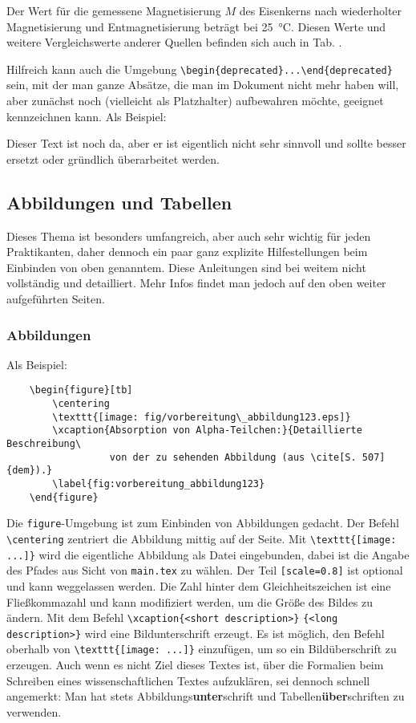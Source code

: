 Der Wert für die gemessene Magnetisierung $M$ des Eisenkerns nach wiederholter Magnetisierung und Entmagnetisierung beträgt  bei \SI{25}{\celsius}. Diesen Werte und weitere Vergleichswerte anderer Quellen befinden sich auch in Tab. .

Hilfreich kann auch die Umgebung \verb|\begin{deprecated}...\end{deprecated}| sein, mit der man ganze Absätze, die man im Dokument nicht mehr haben will, aber zunächst noch (vielleicht als Platzhalter) aufbewahren möchte, geeignet kennzeichnen kann. Als Beispiel:

\begin{deprecated}
Dieser Text ist noch da, aber er ist eigentlich nicht sehr sinnvoll und sollte besser ersetzt oder gründlich überarbeitet werden.
\end{deprecated}

\subsection{Abbildungen und Tabellen}
Dieses Thema ist besonders umfangreich, aber auch sehr wichtig für jeden Praktikanten, daher dennoch ein paar ganz explizite Hilfestellungen beim Einbinden von oben genanntem. Diese Anleitungen sind bei weitem nicht vollständig und detailliert. Mehr Infos findet man jedoch auf den oben weiter aufgeführten Seiten.

\subsubsection{Abbildungen}
Als Beispiel:
\begin{verbatim}
	\begin{figure}[tb]
	    \centering
	    \texttt{[image: fig/vorbereitung\_abbildung123.eps]}
	    \xcaption{Absorption von Alpha-Teilchen:}{Detaillierte Beschreibung\
	              von der zu sehenden Abbildung (aus \cite[S. 507]{dem}).}
	    \label{fig:vorbereitung_abbildung123}
	\end{figure}
\end{verbatim}
Die \verb|figure|-Umgebung ist zum Einbinden von Abbildungen gedacht. Der Befehl \verb|\centering| zentriert die Abbildung mittig auf der Seite. Mit \verb|\texttt{[image: ...]}| wird die eigentliche Abbildung als Datei eingebunden, dabei ist die Angabe des Pfades aus Sicht von \verb|main.tex| zu wählen. Der Teil \verb|[scale=0.8]| ist optional und kann weggelassen werden. Die Zahl hinter dem Gleichheitszeichen ist eine Fließkommazahl und kann modifiziert werden, um die Größe des Bildes zu ändern. Mit dem Befehl \verb|\xcaption{<short description>}| \verb|{<long description>}| wird eine Bildunterschrift erzeugt. Es ist möglich, den Befehl oberhalb von \verb|\texttt{[image: ...]}| einzufügen, um so ein Bildüberschrift zu erzeugen. Auch wenn es nicht Ziel dieses Textes ist, über die Formalien beim Schreiben eines wissenschaftlichen Textes aufzuklären, sei dennoch schnell angemerkt: Man hat stets Abbildungs\textbf{unter}schrift und Tabellen\textbf{über}schriften zu verwenden.


